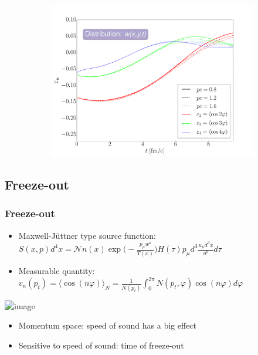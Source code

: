 \documentclass{beamer}
\begin{document}
\begin{frame}
\begin{center}
\begin{figure}[H]
\begin{subfigure}[b]{0.49\textwidth}
        	\includegraphics[width=\textwidth]{pic/res/rel/eps_pgrad_v.pdf}
	\end{subfigure}
\end{figure}
\end{center}
\end{frame}

\subsection{Freeze-out}
\begin{frame}
\frametitle{Freeze-out}
\begin{itemize}
\item<1-> Maxwell-Jüttner type source function: 
$S(x, p)d^4x=\mathcal{N}n(x)\exp{\bigg(-\frac{p_\mu u^\mu}{T(x)}\bigg)}H(\tau)p_\mu d^3\frac{u_\mu d^3x}{u^0} d\tau$
\item<1-> Measurable quantity:
$v_n(p_t)=\langle\cos(n\varphi)\rangle_{N}=\frac{1}{N(p_t)}\int_0^{2\pi} N(p_t, \varphi)\cos(n\varphi)d\varphi$
\end{itemize}
\begin{minipage}{0.49\textwidth}
\begin{center}
\includegraphics<1->[scale=0.23]{pic/res/rel/vn_kappa}
\end{center}
\end{minipage}
\begin{minipage}{0.5\textwidth}
\begin{itemize}
\item<1-> Momentum space: speed of sound has a big effect
\item<1-> Sensitive to speed of sound: time of freeze-out
\end{itemize}
\end{minipage}
\end{frame}
\end{document}
